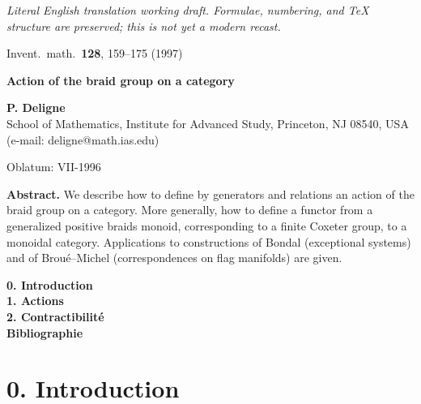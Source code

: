 \documentclass[11pt,a4paper]{article}
\theoremstyle{plain}
\theoremstyle{definition}
\begin{document}
\begin{center}\small\emph{Literal English translation working draft. Formulae, numbering, and TeX structure are preserved; this is not yet a modern recast.}\end{center}
\vspace{0.5em}


\begin{center}
{\small Invent.\ math.\ \textbf{128}, 159--175 (1997)}
\end{center}

\vspace{0.5cm}

\begin{center}
{\LARGE\bfseries Action of the braid group on a category}
\end{center}

\vspace{0.3cm}

\begin{center}
\textbf{P. Deligne}\\[0.2cm]
School of Mathematics, Institute for Advanced Study, Princeton, NJ 08540, USA\\
(e-mail: deligne@math.ias.edu)
\end{center}

\vspace{0.2cm}

\noindent Oblatum: VII-1996

\vspace{0.3cm}

\noindent\textbf{Abstract.} We describe how to define by generators and relations an action of the braid group on a category. More generally, how to define a functor from a generalized positive braids monoid, corresponding to a finite Coxeter group, to a monoidal category. Applications to constructions of Bondal (exceptional systems) and of Brou\'e--Michel (correspondences on flag manifolds) are given.

\vspace{0.5cm}

\noindent\textbf{0. Introduction} \\
\textbf{1. Actions} \\
\textbf{2. Contractibilit\'e} \\
\textbf{Bibliographie} 

\vspace{0.5cm}

\section*{0. Introduction}
\end{document}
